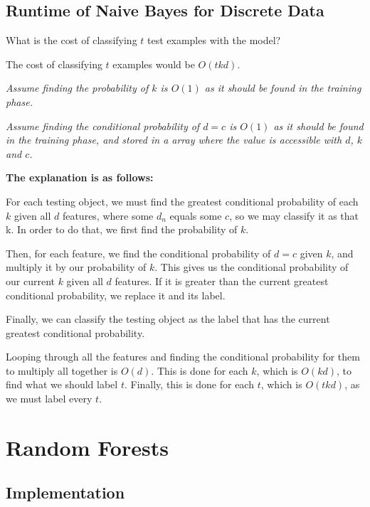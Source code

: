 \documentclass{article}
\def\blu#1{{\color{blu}#1}}
\begin{document}
\subsection{Runtime of Naive Bayes for Discrete Data}

\blu{What is the cost of classifying $t$ test examples with the model?}

The cost of classifying $t$ examples would be $O(tkd)$.

\textit{Assume finding the probability of $k$ is $O(1)$ as it should be found in the training phase.}

\textit{Assume finding the conditional probability of $d = c$ is $O(1)$ as it should be found in the training phase, and stored in a array where the value is accessible with $d$, $k$ and $c$.}

\textbf{The explanation is as follows:}

For each testing object, we must find the greatest conditional probability of each $k$ given all $d$ features, where some $d_n$ equals some $c$, so we may classify it as that k. In order to do that, we first find the probability of $k$. 

Then, for each feature, we find the conditional probability of $d = c$ given $k$, and multiply it by our probability of $k$.  This gives us the conditional probability of our current $k$ given all $d$ features. If it is greater than the current greatest conditional probability, we replace it and its label.

Finally, we can classify the testing object as the label that has the current greatest conditional probability.

Looping through all the features and finding the conditional probability for them to multiply all together is $O(d)$.
This is done for each $k$, which is $O(kd)$, to find what we should label $t$.
Finally, this is done for each $t$, which is $O(tkd)$, as we must label every $t$.



\section{Random Forests}

\subsection{Implementation}
\end{document}
